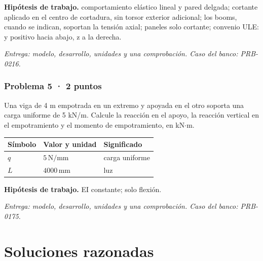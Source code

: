 \begin{minipage}{\linewidth}
\par\textbf{Hipótesis de trabajo.} comportamiento elástico lineal y pared delgada; cortante aplicado en el centro de cortadura, sin torsor exterior adicional; los booms, cuando se indican, soportan la tensión axial; paneles solo cortante; convenio ULE: y positivo hacia abajo, z a la derecha.

\par\textit{Entrega: modelo, desarrollo, unidades y una comprobación. Caso del banco: PRB-0216.}\end{minipage}\par\medskip

\par\medskip\noindent\begin{minipage}{\linewidth}

\section{Problema 5 · 2 puntos}

Una viga de 4 m empotrada en un extremo y apoyada en el otro soporta una carga uniforme de 5 kN/m. Calcule la reacción en el apoyo, la reacción vertical en el empotramiento y el momento de empotramiento, en kN$\cdot$m.

\par\medskip\noindent\begin{tabular}{@{}p{.18\linewidth}p{.26\linewidth}p{.48\linewidth}@{}}
\toprule Símbolo & Valor y unidad & Significado\\\midrule
$q$ & $5\,\mathrm{N/mm}$ & carga uniforme\\
$L$ & $4000\,\mathrm{mm}$ & luz\\
\bottomrule\end{tabular}\par\medskip



\par\textbf{Hipótesis de trabajo.} EI constante; solo flexión.

\par\textit{Entrega: modelo, desarrollo, unidades y una comprobación. Caso del banco: PRB-0175.}\end{minipage}\par\medskip


\part{Soluciones razonadas}

